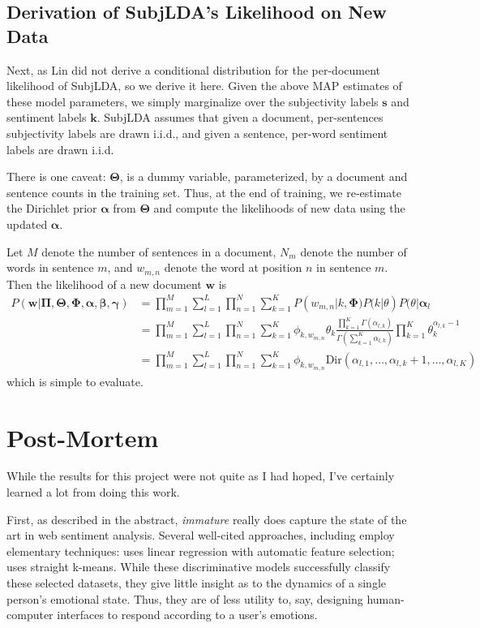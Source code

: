 \documentclass{article}
\begin{document}
\subsection{Derivation of SubjLDA's Likelihood on New Data}
Next, as Lin did not derive a conditional distribution for the
per-document likelihood of SubjLDA, so we derive it here. Given the
above MAP estimates of these model parameters, we simply marginalize
over the subjectivity labels $\mathbf{s}$ and sentiment labels
$\mathbf{k}$. SubjLDA assumes that given a document, per-sentences
subjectivity labels are drawn i.i.d., and given a sentence, per-word
sentiment labels are drawn i.i.d.

There is one caveat: $\mathbf{\Theta}$, is a dummy variable,
parameterized, by a document and sentence counts in the training
set. Thus, at the end of training, we re-estimate the Dirichlet prior
$\mathbf{\alpha}$ from $\mathbf{\Theta}$ and compute the likelihoods
of new data using the updated $\mathbf{\alpha}$.

Let $M$ denote the number of sentences in a document, $N_m$ denote
the number of words in sentence $m$, and $w_{m,n}$ denote the word
at position $n$ in sentence $m$. Then the likelihood of a new
document $\mathbf{w}$ is
\begin{align} \label{eqn:subjlda-likelihood}
P(\mathbf{w} | \mathbf{\Pi,\Theta,\Phi,\alpha,\beta,\gamma}) 
    &= \prod_{m=1}^M \sum_{l=1}^L \prod_{n=1}^N \sum_{k=1}^K P(w_{m,n} | k, \mathbf{\Phi} ) P( k | \theta ) P ( \theta | \mathbf{\alpha}_l \\
    &= \prod_{m=1}^M \sum_{l=1}^L \prod_{n=1}^N \sum_{k=1}^K \phi_{k,w_{m,n}} \theta_k \frac{\prod_{k=1}^K \Gamma(\alpha_{l,k})}{\Gamma \left( \sum_{k=1}^K \alpha_{l,k} \right)} \prod_{k=1}^K \theta_k^{\alpha_{l,k} - 1} \\
    &= \prod_{m=1}^M \sum_{l=1}^L \prod_{n=1}^N \sum_{k=1}^K \phi_{k,w_{m,n}} \mbox{Dir} \left( \alpha_{l,1}, \ldots, \alpha_{l,k} + 1, \ldots, \alpha_{l,K} \right)
\end{align}
which is simple to evaluate.

\section{Post-Mortem}
While the results for this project were not quite as I had hoped,
I've certainly learned a lot from doing this work.

First, as described in the abstract, \emph{immature} really does
capture the state of the art in web sentiment analysis. Several
well-cited approaches, including \citep{mishne06, alm08, sood09}
employ elementary techniques: \citep{mishne06} uses linear regression
with automatic feature selection; \citep{sood09} uses straight
k-means. While these discriminative models successfully classify
these selected datasets, they give little insight as to the
dynamics of a single person's emotional state. Thus, they are of
less utility to, say, designing human-computer interfaces to
respond according to a user's emotions.
\end{document}
